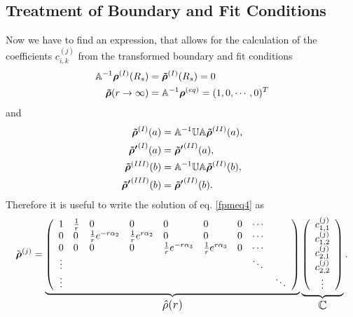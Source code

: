 \subsection{Treatment of Boundary and Fit Conditions}
\label{FBC}
Now we have to find an expression, that allows for the calculation of the coefficients $c_{i,k}^{(j)}$ from the transformed boundary and fit conditions
\begin{align}
    \mathbb{A}^{-1}\boldsymbol{\mathbf{\rho}}^{(I)}(R_s) &= \boldsymbol{\mathbf{\tilde{\rho}}}^{(I)}(R_s) = 0 \nonumber \\
    \boldsymbol{\mathbf{\tilde{\rho}}}(r \rightarrow \infty) &= \mathbb{A}^{-1} \boldsymbol{\mathbf{\rho}}^{(eq)} = (1,0,\cdots,0)^{T}
\end{align}
and
\begin{align}
    \boldsymbol{\mathbf{\tilde{\rho}}}^{(I)}(a) &= \mathbb{A}^{-1}\mathbb{U}\mathbb{A} \boldsymbol{\mathbf{\tilde{\rho}}}^{(II)}(a), \\ \nonumber
    \boldsymbol{\mathbf{\tilde{\rho} '}}^{(I)}(a) &= \boldsymbol{\mathbf{\tilde{\rho} '}}^{(II)}(a), \\ \nonumber
    \boldsymbol{\mathbf{\tilde{\rho}}}^{(III)}(b) &= \mathbb{A}^{-1}\mathbb{U}\mathbb{A} \boldsymbol{\mathbf{\tilde{\rho}}}^{(II)}(b), \\ \nonumber
    \boldsymbol{\mathbf{\tilde{\rho} '}}^{(III)}(b) &= \boldsymbol{\mathbf{\tilde{\rho} '}}^{(II)}(b).
\end{align}
Therefore it is useful to write the solution of eq. \eqref{fpmeq4} as
\begin{equation}
    \tilde{\boldsymbol{\mathbf{\rho}}}^{(j)} = \underbrace{ \left( \begin{array}{cllllllll}
       1   & \frac{1}{r}   & 0                 & 0                 & 0              & 0             & 0 & \cdots &\\
       0   & 0             &\frac{1}{r} e^{-r \alpha_2}   &\frac{1}{r} e^{r \alpha_2 }   & 0              & 0             & 0 & \cdots &\\
       0   & 0             & 0                 & 0                 &\frac{1}{r} e^{-r\alpha_3} &\frac{1}{r} e^{r\alpha_3} & 0 & \cdots &\\
       \vdots  &&&&&&&\ddots &\\
       \vdots  &&&&&&&&\ddots
   \end{array} \right)}_\text{\large$\hat{\rho}(r)$}
   \underbrace{\left(\begin{array}{c}  
       c_{1,1}^{(j)} \\ 
       c_{1,2}^{(j)} \\ 
       c_{2,1}^{(j)} \\ 
       c_{2,2}^{(j)}  \\ 
       \vdots 
   \end{array} \right)}_\text{\large$\mathbb{C}$}.
\end{equation}
